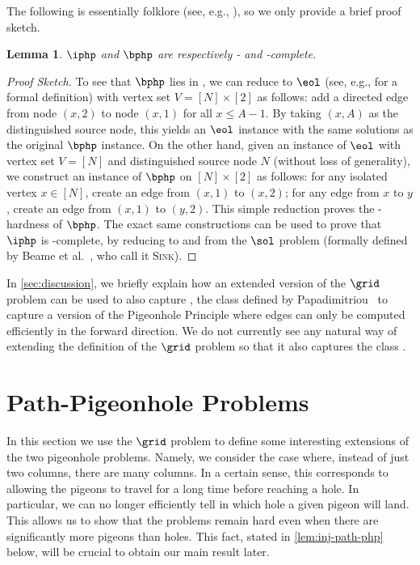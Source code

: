 \documentclass[10pt,a4paper]{article}
\theoremstyle{definition}
\theoremstyle{plain}
\newtheorem{lemma}{Lemma}
\theoremstyle{remark}
\begin{document}
The following is essentially folklore (see, e.g., \cite{Buresh2004}), so we only provide a brief proof sketch.

\begin{lemma}\label{lem:PPAD-as-PHP}
$\iphp$ and $\bphp$ are respectively \PPADS- and \PPAD-complete.
\end{lemma}

\begin{proof}[Proof Sketch]
To see that $\bphp$ lies in \PPAD, we can reduce to $\eol$ (see, e.g., \cite{Daskalakis2009} for a formal definition) with vertex set $V = [N] \times [2]$ as follows: add a directed edge from node $(x,2)$ to node $(x,1)$ for all $x \leq A-1$. By taking $(x,A)$ as the distinguished source node, this yields an $\eol$ instance with the same solutions as the original $\bphp$ instance. On the other hand, given an instance of $\eol$ with vertex set $V = [N]$ and distinguished source node $N$ (without loss of generality), we construct an instance of $\bphp$ on $[N] \times [2]$ as follows: for any isolated vertex $x \in [N]$, create an edge from $(x,1)$ to $(x,2)$; for any edge from $x$ to $y$, create an edge from $(x,1)$ to $(y,2)$. This simple reduction proves the \PPAD-hardness of $\bphp$. The exact same constructions can be used to prove that $\iphp$ is \PPADS-complete, by reducing to and from the $\sol$ problem (formally defined by Beame et al.~\cite{Beame1998}, who call it {\scshape Sink}).
\end{proof}








In \cref{sec:discussion}, we briefly explain how an extended version of the $\grid$ problem can be used to also capture \PPP, the class defined by Papadimitriou~\cite{Papadimitriou1994} to capture a version of the Pigeonhole Principle where edges can only be computed efficiently in the forward direction. We do not currently see any natural way of extending the definition of the $\grid$ problem so that it also captures the class \PPA.










\section{Path-Pigeonhole Problems}

In this section we use the $\grid$ problem to define some interesting extensions of the two pigeonhole problems. Namely, we consider the case where, instead of just two columns, there are many columns. In a certain sense, this corresponds to allowing the pigeons to travel for a long time before reaching a hole. In particular, we can no longer efficiently tell in which hole a given pigeon will land. This allows us to show that the problems remain hard even when there are significantly more pigeons than holes. This fact, stated in \cref{lem:inj-path-php} below, will be crucial to obtain our main result later.
\end{document}
